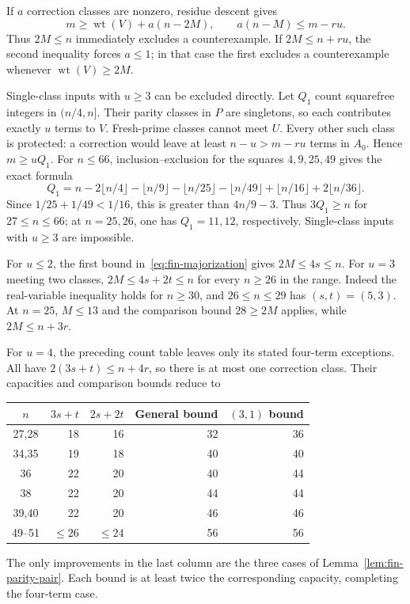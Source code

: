 \documentclass[11pt]{article}
\DeclareMathOperator{\wt}{wt}\DeclareMathOperator{\ord}{ord}
\numberwithin{equation}{section}
\theoremstyle{definition}\newtheorem{definition}[theorem]{Definition}
\theoremstyle{remark}\newtheorem{remark}[theorem]{Remark}
\begin{document}
If $a$ correction classes are nonzero, residue descent gives
\begin{equation}\label{eq:fin-capacity-gates}
 m\ge\wt(V)+a(n-2M),\qquad
 a(n-M)\le m-ru.
\end{equation}
Thus $2M\le n$ immediately excludes a counterexample.  If
$2M\le n+ru$, the second inequality forces $a\le1$; in that
case the first excludes a counterexample whenever $\wt(V)\ge2M$.

Single-class inputs with $u\ge3$ can be excluded directly.  Let $Q_1$ count squarefree integers in $(n/4,n]$.
Their parity classes in $P$ are singletons, so each contributes
exactly $u$ terms to $V$.  Fresh-prime classes cannot meet $U$.
Every other such class is protected: a correction would leave at
least $n-u>m-ru$ terms in $A_0$.  Hence $m\ge uQ_1$.
For $n\le66$, inclusion--exclusion for the squares $4,9,25,49$
gives the exact formula
\[
 Q_1=n-2\lfloor n/4\rfloor-\lfloor n/9\rfloor
       -\lfloor n/25\rfloor-\lfloor n/49\rfloor
       +\lfloor n/16\rfloor+2\lfloor n/36\rfloor.
\]
Since $1/25+1/49<1/16$, this is greater than $4n/9-3$.
Thus $3Q_1\ge n$ for $27\le n\le66$; at $n=25,26$, one has
$Q_1=11,12$, respectively.  Single-class inputs with $u\ge3$ are impossible.

For $u\le2$, the first bound in~\eqref{eq:fin-majorization} gives
$2M\le4s\le n$.  For $u=3$ meeting two classes,
$2M\le4s+2t\le n$ for every $n\ge26$ in the range.  Indeed the
real-variable inequality holds for $n\ge30$, and $26\le n\le29$
has $(s,t)=(5,3)$.  At $n=25$, $M\le13$ and the comparison bound
$28\ge2M$ applies, while $2M\le n+3r$.

For $u=4$, the preceding count table leaves only its stated
four-term exceptions.  All have $2(3s+t)\le n+4r$, so there is
at most one correction class.  Their capacities and comparison
bounds reduce to
\begin{center}
\begin{tabular}{c|r|r|r|r}
$n$&$3s+t$&$2s+2t$&General bound&$(3,1)$ bound\\\hline
27,28&18&16&32&36\\
34,35&19&18&40&40\\
36&22&20&40&44\\
38&22&20&44&44\\
39,40&22&20&46&46\\
49--51&$\le26$&$\le24$&56&56
\end{tabular}
\end{center}
The only improvements in the last column are the three cases of
Lemma~\ref{lem:fin-parity-pair}.  Each bound is at least twice the
corresponding capacity, completing the four-term case.
\end{document}
